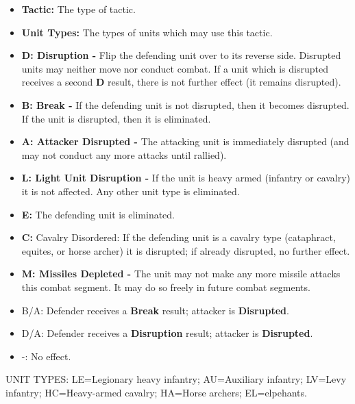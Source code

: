 \begin{minipage}{\textwidth}
  \begin{itemize}
    \item \textbf{Tactic:} The type of tactic.
    \item \textbf{Unit Types:} The types of units which may use this tactic.
    \item \textbf{D: Disruption -} Flip the defending unit over to its reverse side. Disrupted units may neither move nor conduct combat. If a unit which is disrupted receives a second \textbf{D} result, there is not further effect (it remains disrupted).
    \item \textbf{B: Break -} If the defending unit is not disrupted, then it becomes disrupted. If the unit is disrupted, then it is eliminated.
    \item \textbf{A: Attacker Disrupted -} The attacking unit is immediately disrupted (and may not conduct any more attacks until rallied).
    \item \textbf{L: Light Unit Disruption -} If the unit is heavy armed (infantry or cavalry) it is not affected. Any other unit type is eliminated.
    \item \textbf{E: } The defending unit is eliminated.
    \item \textbf{C: } Cavalry Disordered: If the defending unit is a cavalry type (cataphract, equites, or horse archer) it is disrupted; if already disrupted, no further effect.
    \item \textbf{M: Missiles Depleted -} The unit may not make any more missile attacks this combat segment. It may do so freely in future combat segments.
    \item{B/A:} Defender receives a \textbf{Break} result; attacker is \textbf{Disrupted}.
    \item{D/A:} Defender receives a \textbf{Disruption} result; attacker is \textbf{Disrupted}.
    \item{-:} No effect.
  \end{itemize}
  \medskip
  UNIT TYPES: LE=Legionary heavy infantry; AU=Auxiliary infantry; LV=Levy infantry; HC=Heavy-armed cavalry; HA=Horse archers; EL=elpehants.
\end{minipage}